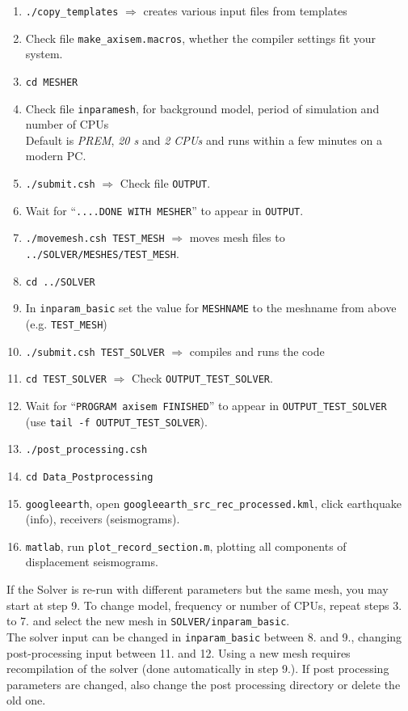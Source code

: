 \documentclass[11pt,letter,fleqn,english,notitlepage]{article}
\begin{document}
\begin{enumerate}
\item \verb|./copy_templates| $\Rightarrow$ creates various input files from templates
\item Check file \verb|make_axisem.macros|, whether the compiler settings fit your system.
\item \verb|cd MESHER| 
\item Check file {\tt inparamesh}, for background model, period of simulation and number of CPUs \\
      Default is \textit{PREM}, \textit{20 s} and \textit{2 CPUs} and runs within a few minutes on a modern PC.
\item \verb|./submit.csh| $\Rightarrow$ Check file {\tt OUTPUT}.
\item Wait for ``{\tt ....DONE WITH MESHER}'' to appear in {\tt OUTPUT}.
\item \verb|./movemesh.csh TEST_MESH| $\Rightarrow$ moves mesh files to \verb|../SOLVER/MESHES/TEST_MESH|.
\item \verb|cd ../SOLVER|
\item In \verb|inparam_basic| set the value for \verb|MESHNAME| to the meshname from above (e.g. \verb|TEST_MESH|)
\item \verb|./submit.csh TEST_SOLVER|  $\Rightarrow$ compiles and runs the code
\item \verb|cd TEST_SOLVER| $\Rightarrow$ Check \verb|OUTPUT_TEST_SOLVER|.
\item Wait for ``\verb|PROGRAM axisem FINISHED|'' to appear in \verb|OUTPUT_TEST_SOLVER| \\(use \verb|tail -f OUTPUT_TEST_SOLVER|).
\item \verb|./post_processing.csh|
\item \verb|cd Data_Postprocessing| 
\item \verb|googleearth|, open {\tt googleearth\_src\_rec\_processed.kml}, click
        earthquake (info), receivers (seismograms).
\item {\tt matlab}, run {\tt plot\_record\_section.m}, plotting all components
        of displacement seismograms.

\end{enumerate}
If the Solver is re-run with different parameters but the same mesh, you may start at step 9. 
To change model, frequency or number of CPUs, repeat steps 3. to 7. and select the new mesh in \verb|SOLVER/inparam_basic|. \\
The solver input can be changed in \verb|inparam_basic| between 8. and 9.,
changing post-processing input between 11. and 12. Using a new mesh requires
recompilation of the solver (done automatically in step 9.). If post
processing parameters are changed, also change the post processing directory or
delete the old one.
\end{document}
